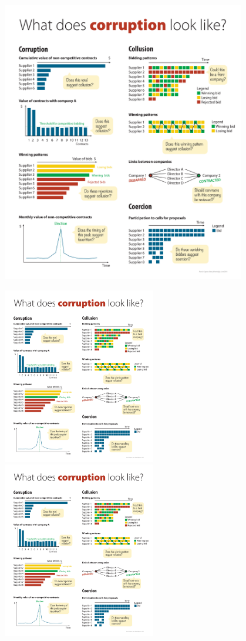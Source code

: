 \begin{center}
\includegraphics[max width=0.8\textwidth]{../img/poster_what.pdf}

\end{center}

\includegraphics[max width=0.5\textwidth]{../img/poster_coercion.pdf}
\includegraphics[max width=0.5\textwidth]{../img/poster_link.pdf}

